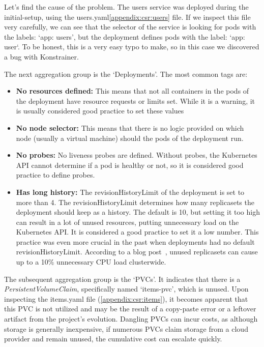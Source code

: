 Let's find the cause of the problem. The users service was deployed during the initial-setup, using the users.yaml\ref{appendix:csr:users} file. If we inspect this file very carefully, we can see that the selector of the service is looking for pods with the labels: `app: users', but the deployment defines pods with the label: `app: user`. To be honest, this is a very easy typo to make, so in this case we discovered a bug with Konstrainer.

The next aggregation group is the `Deployments'. The most common tags are:

\begin{itemize}
  \item \textbf{No resources defined:} This means that not all containers in the pods of the deployment have resource requests or limits set. While it is a warning, it is usually considered good practice to set these values
  \item \textbf{No node selector:} This means that there is no logic provided on which node (usually a virtual machine) should the pods of the deployment run.
  \item \textbf{No probes:} No liveness probes are defined. Without probes, the Kubernetes API cannot determine if a pod is healthy or not, so it is considered good practice to define probes.
  \item \textbf{Has long history:} The revisionHistoryLimit of the deployment is set to more than 4. The revisionHistoryLimit determines how many replicasets the deployment should keep as a history. The default is 10, but setting it too high can result in a lot of unused resources, putting unnecessary load on the Kubernetes API. It is considered a good practice to set it a low number. This practice was even more crucial in the past when deployments had no default revisionHistoryLimit. According to a blog post~\cite{RevisionHystory}, unused replicasets can cause up to a 10\% unnecessary CPU load clusterwide.
\end{itemize}

The subsequent aggregation group is the `PVCs'. It indicates that there is a \emph{PersistentVolumeClaim}, specifically named `items-pvc', which is unused. Upon inspecting the items.yaml file (\ref{appendix:csr:items}), it becomes apparent that this PVC is not utilized and may be the result of a copy-paste error or a leftover artifact from the project's evolution. Dangling PVCs can incur costs, as although storage is generally inexpensive, if numerous PVCs claim storage from a cloud provider and remain unused, the cumulative cost can escalate quickly. 

